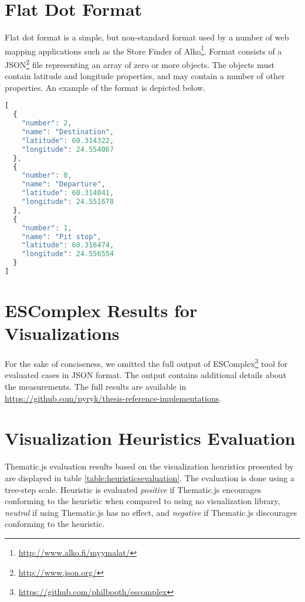 
\chapter{Flat Dot Format}
\label{appendix:flatdotformat}

Flat dot format is a simple, but non-standard format used by a number of web mapping applications such as the Store Finder of Alko\footnote{\url{http://www.alko.fi/myymalat/}}. Format consists of a JSON\footnote{\url{http://www.json.org/}} file representing an array of zero or more objects. The objects must contain latitude and longitude properties, and may contain a number of other properties. An example of the format is depicted below.

\begin{lstlisting}[language=JavaScript]
[
  {
    "number": 2,
    "name": "Destination",
    "latitude": 60.314322,
    "longitude": 24.554067
  },
  {
    "number": 0,
    "name": "Departure",
    "latitude": 60.314041,
    "longitude": 24.551678
  },
  {
    "number": 1,
    "name": "Pit stop",
    "latitude": 60.316474,
    "longitude": 24.556554
  }
]
\end{lstlisting}

\chapter{ESComplex Results for Visualizations}
\label{appendix:escomplex}

For the sake of conciseness, we omitted the full output of ESComplex\footnote{\url{https://github.com/philbooth/escomplex}} tool for evaluated cases in JSON format. The output contains additional details about the measurements. The full results are available in \url{https://github.com/pyryk/thesis-reference-implementations}.

\chapter{Visualization Heuristics Evaluation}
\label{appendix:heuristicsevaluation}

Thematic.js evaluation results based on the visualization heuristics presented by \citet{zuk_heuristics_2006} are displayed in table \ref{table:heuristicsevaluation}. The evaluation is done using a tree-step scale. Heuristic is evaluated \emph{positive} if Thematic.js encourages conforming to the heuristic when compared to using no visualization library, \emph{neutral} if using Thematic.js has no effect, and \emph{negative} if Thematic.js discourages conforming to the heuristic.

